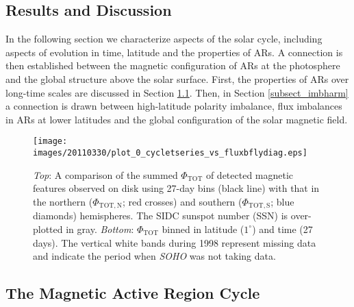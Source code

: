 \documentclass[namedreferences]{solarphysics}
\begin{document}
\begin{article}
\section{Results and Discussion}\label{results}


In the following section we characterize aspects of the solar cycle, including aspects of evolution in time, latitude and the properties of ARs. A connection is then established between the magnetic configuration of ARs at the photosphere and the global structure above the solar surface. First, the properties of ARs over long-time scales are discussed in Section \ref{subsect_arcycle}. Then, in Section \ref{subsect_imbharm} a connection is drawn between high-latitude polarity imbalance, flux imbalances in ARs at lower latitudes and the global configuration of the solar magnetic field.




\begin{figure*}[!t]
 
\texttt{[image: images/20110330/plot\_0\_cycletseries\_vs\_fluxbflydiag.eps]}
\caption{\emph{Top}: A comparison of the summed $\Phi_{\mathrm{TOT}}$ of detected magnetic features observed on disk using 27-day bins (black line) with that in the northern ($\Phi_{\mathrm{TOT,N}}$; red crosses) and southern ($\Phi_{\mathrm{TOT,S}}$; blue diamonds) hemispheres. The SIDC sunspot number (SSN) is over-plotted in gray. \emph{Bottom}: $\Phi_{\mathrm{TOT}}$ binned in latitude ($1^{\circ}$) and time (27\,days). The vertical white bands during 1998 represent missing data and indicate the period when \emph{SOHO} was not taking data.}\label{plot_0_cycletseries_vs_fluxbflydiag}
\end{figure*}

\subsection{The Magnetic Active Region Cycle}\label{subsect_arcycle}


\end{article}
\end{document}
